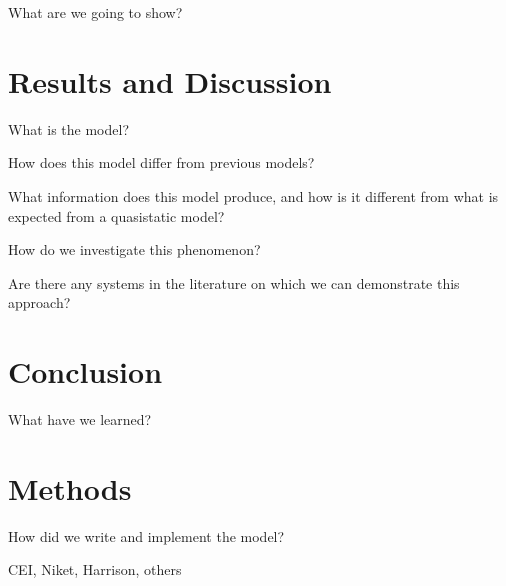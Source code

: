 \documentclass[journal=apchd5,manuscript=article]{achemso}
\begin{document}
What are we going to show?

\section{Results and Discussion}

What is the model?



How does this model differ from previous models?

What information does this model produce, and how is it different from what is expected from a quasistatic model?

How do we investigate this phenomenon?

Are there any systems in the literature on which we can demonstrate this approach?

\section{Conclusion}
What have we learned?

\section{Methods}

How did we write and implement the model?

\begin{acknowledgement}
CEI, Niket, Harrison, others
\end{acknowledgement}


\end{document}
